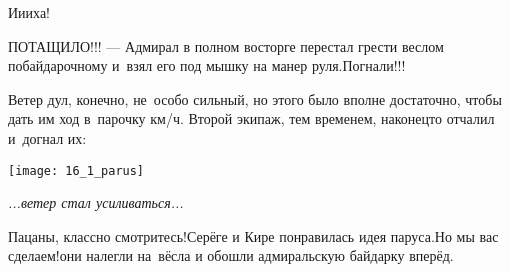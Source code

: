 \par
\endgroup

\noindent
\begin{minipage}{0.38\textwidth}
	\setlength{\parindent}{1.0cm}  %
	\setlength{\parskip}{0.25cm}     %
	
	\vspace{-0.4cm}
	\diagdash И\sdash и\sdash иха! 
	
	\diagdash ПОТАЩИЛО!!! --- Адмирал в полном восторге перестал грести веслом по\sdash байдарочному и~взял его под мышку на манер руля.\mdash Погнали!!!
	
	Ветер дул, конечно, не~особо сильный, но этого было вполне достаточно, чтобы дать им ход в~парочку км/ч. Второй экипаж, тем временем, наконец\sdash то отчалил и~догнал их:
\end{minipage}\hfill
\begin{minipage}{0.57\textwidth}
	\centering
	\texttt{[image: 16\_1\_parus]}
	
	{\small\textit{...ветер стал усиливаться...}}
\end{minipage}




%
%

\diagdash Пацаны, классно смотритесь!\mdash Серёге и Кире понравилась идея паруса.\mdash Но мы вас сделаем!\mdash они налегли на~вёсла и обошли адмиральскую байдарку вперёд.

